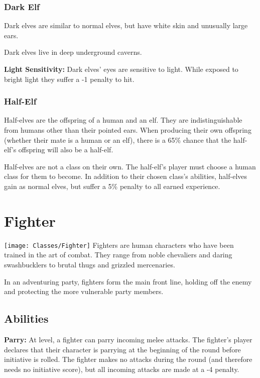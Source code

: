 \begin{multicols*}{2}

\subsubsection{Dark Elf}
Dark elves are similar to normal elves, but have white skin and unusually large ears.

Dark elves live in deep underground caverns.

\textbf{Light Sensitivity:} Dark elves' eyes are sensitive to light. While exposed to bright light they suffer a -1 penalty to hit.

\subsubsection{Half-Elf}
Half-elves are the offspring of a human and an elf. They are indistinguishable from humans other than their pointed ears. When producing their own offspring (whether their mate is a human or an elf), there is a 65\% chance that the half-elf’s offspring will also be a half-elf.

Half-elves are not a class on their own. The half-elf’s player must choose a human class for them to become. In addition to their chosen class’s abilities, half-elves gain  as normal elves, but suffer a 5\% penalty to all earned experience.

\section{Fighter}\label{class:Fighter}
\texttt{[image: Classes/Fighter]}
Fighters are human characters who have been trained in the art of combat. They range from noble chevaliers and daring swashbucklers to brutal thugs and grizzled mercenaries.

In an adventuring party, fighters form the main front line, holding off the enemy and protecting the more vulnerable party members.

\subsection{Abilities}
\textbf{Parry:}\label{sec:Parry} At  level, a fighter can parry incoming melee attacks. The fighter’s player declares that their character is parrying at the beginning of the round before initiative is rolled. The fighter makes no attacks during the round (and therefore needs no initiative score), but all incoming attacks are made at a -4 penalty.


\end{multicols*}
